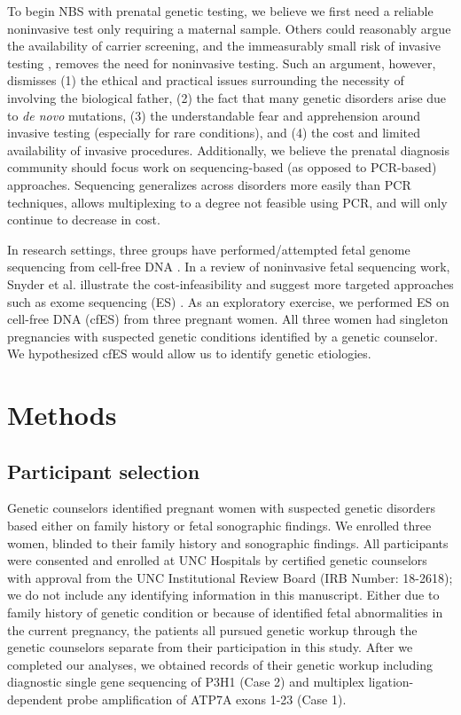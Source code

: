 \documentclass{article}\usepackage[]{graphicx}\usepackage[]{color}
\begin{document}
To begin NBS with prenatal genetic testing, we believe we first need a reliable noninvasive test only requiring a maternal sample.
Others could reasonably argue the availability of carrier screening, and the immeasurably small risk of invasive testing \cite{salomon:2019aa}, removes the need for noninvasive testing.
Such an argument, however, dismisses (1) the ethical and practical issues surrounding the necessity of involving the biological father, (2) the fact that many genetic disorders arise due to \textit{de novo} mutations, (3) the understandable fear and apprehension around invasive testing (especially for rare conditions), and (4) the cost and limited availability of invasive procedures.
Additionally, we believe the prenatal diagnosis community should focus work on sequencing-based (as opposed to PCR-based) approaches.
Sequencing generalizes across disorders more easily than PCR techniques, allows multiplexing to a degree not feasible using PCR, and will only continue to decrease in cost.

In research settings, three groups have performed/attempted fetal genome sequencing from cell-free DNA \cite{lo:2010aa,kitzman:2012aa,fan:2012aa}.
In a review of noninvasive fetal sequencing work, Snyder et al. illustrate the cost-infeasibility and suggest more targeted approaches such as exome sequencing (ES) \cite{snyder:2013aa}.
As an exploratory exercise, we performed ES on cell-free DNA (cfES) from three pregnant women.
All three women had singleton pregnancies with suspected genetic conditions identified by a genetic counselor.
We hypothesized cfES would allow us to identify genetic etiologies.

\section{Methods}

\subsection{Participant selection}
Genetic counselors identified pregnant women with suspected genetic disorders based either on family history or fetal sonographic findings.
We enrolled three women, blinded to their family history and sonographic findings.
All participants were consented and enrolled at UNC Hospitals by certified genetic counselors with approval from the UNC Institutional Review Board (IRB Number: 18-2618); we do not include any identifying information in this manuscript.
Either due to family history of genetic condition or because of identified fetal abnormalities in the current pregnancy, the patients all pursued genetic workup through the genetic counselors separate from their participation in this study.
After we completed our analyses, we obtained records of their genetic workup including diagnostic single gene sequencing of P3H1 (Case 2) and multiplex ligation-dependent probe amplification of ATP7A exons 1-23 (Case 1).
\end{document}
